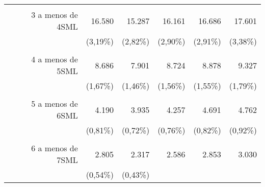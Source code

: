 \begin{tabular}{llllll}
  \multicolumn{1}{r}{} &
  \multicolumn{1}{r}{} &
  \multicolumn{1}{r}{} &
  \multicolumn{1}{r}{} \\
\multicolumn{1}{r}{3 a menos de 4SML\hspace{1em}} &
  \multicolumn{1}{|r}{16.580} &
  \multicolumn{1}{r}{15.287} &
  \multicolumn{1}{r}{16.161} &
  \multicolumn{1}{r}{16.686} &
  \multicolumn{1}{r}{17.601} \\
\multicolumn{1}{r}{} &
  \multicolumn{1}{|r}{(3,19\%)} &
  \multicolumn{1}{r}{(2,82\%)} &
  \multicolumn{1}{r}{(2,90\%)} &
  \multicolumn{1}{r}{(2,91\%)} &
  \multicolumn{1}{r}{(3,38\%)} \\
\multicolumn{1}{r}{} &
  \multicolumn{1}{|r}{} &
  \multicolumn{1}{r}{} &
  \multicolumn{1}{r}{} &
  \multicolumn{1}{r}{} &
  \multicolumn{1}{r}{} \\
\multicolumn{1}{r}{4 a menos de 5SML\hspace{1em}} &
  \multicolumn{1}{|r}{8.686} &
  \multicolumn{1}{r}{7.901} &
  \multicolumn{1}{r}{8.724} &
  \multicolumn{1}{r}{8.878} &
  \multicolumn{1}{r}{9.327} \\
\multicolumn{1}{r}{} &
  \multicolumn{1}{|r}{(1,67\%)} &
  \multicolumn{1}{r}{(1,46\%)} &
  \multicolumn{1}{r}{(1,56\%)} &
  \multicolumn{1}{r}{(1,55\%)} &
  \multicolumn{1}{r}{(1,79\%)} \\
\multicolumn{1}{r}{} &
  \multicolumn{1}{|r}{} &
  \multicolumn{1}{r}{} &
  \multicolumn{1}{r}{} &
  \multicolumn{1}{r}{} &
  \multicolumn{1}{r}{} \\
\multicolumn{1}{r}{5 a menos de 6SML\hspace{1em}} &
  \multicolumn{1}{|r}{4.190} &
  \multicolumn{1}{r}{3.935} &
  \multicolumn{1}{r}{4.257} &
  \multicolumn{1}{r}{4.691} &
  \multicolumn{1}{r}{4.762} \\
\multicolumn{1}{r}{} &
  \multicolumn{1}{|r}{(0,81\%)} &
  \multicolumn{1}{r}{(0,72\%)} &
  \multicolumn{1}{r}{(0,76\%)} &
  \multicolumn{1}{r}{(0,82\%)} &
  \multicolumn{1}{r}{(0,92\%)} \\
\multicolumn{1}{r}{} &
  \multicolumn{1}{|r}{} &
  \multicolumn{1}{r}{} &
  \multicolumn{1}{r}{} &
  \multicolumn{1}{r}{} &
  \multicolumn{1}{r}{} \\
\multicolumn{1}{r}{6 a menos de 7SML\hspace{1em}} &
  \multicolumn{1}{|r}{2.805} &
  \multicolumn{1}{r}{2.317} &
  \multicolumn{1}{r}{2.586} &
  \multicolumn{1}{r}{2.853} &
  \multicolumn{1}{r}{3.030} \\
\multicolumn{1}{r}{} &
  \multicolumn{1}{|r}{(0,54\%)} &
  \multicolumn{1}{r}{(0,43\%)} &

\end{tabular}
